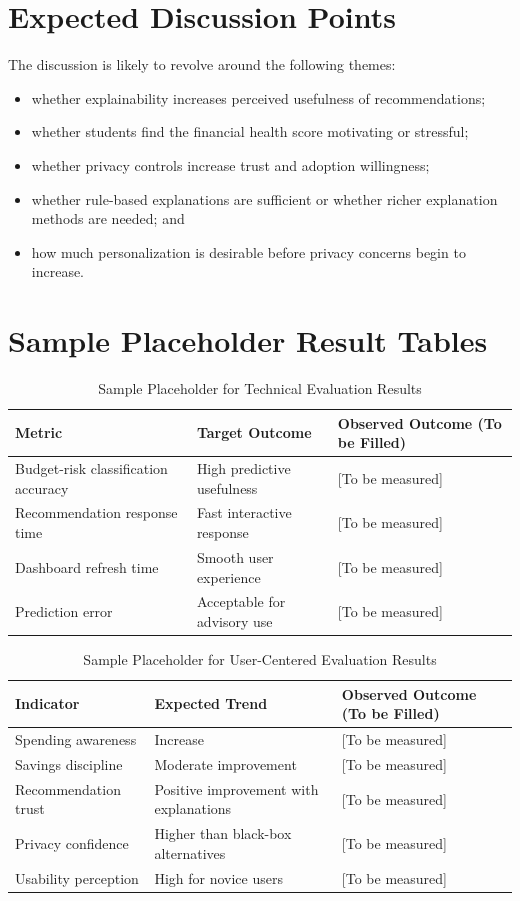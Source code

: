\documentclass[12pt,a4paper]{report}
\begin{document}
\section{Expected Discussion Points}
The discussion is likely to revolve around the following themes:
\begin{itemize}[leftmargin=2em]
\item whether explainability increases perceived usefulness of recommendations;
\item whether students find the financial health score motivating or stressful;
\item whether privacy controls increase trust and adoption willingness;
\item whether rule-based explanations are sufficient or whether richer explanation methods are needed;
and
\item how much personalization is desirable before privacy concerns begin to increase.
\end{itemize}

\section{Sample Placeholder Result Tables}
\begin{table}[H]
\centering
\caption{Sample Placeholder for Technical Evaluation Results}
\label{tab:placeholdertechnical}
\begin{tabular}{p{5cm}p{4cm}p{4cm}}
\toprule
\textbf{Metric} & \textbf{Target Outcome} & \textbf{Observed Outcome (To be Filled)} \\
\midrule
Budget-risk classification accuracy & High predictive usefulness & [To be measured] \\
Recommendation response time & Fast interactive response & [To be measured] \\
Dashboard refresh time & Smooth user experience & [To be measured] \\
Prediction error & Acceptable for advisory use & [To be measured] \\
\bottomrule
\end{tabular}
\end{table}

\begin{table}[H]
\centering
\caption{Sample Placeholder for User-Centered Evaluation Results}
\label{tab:placeholderuser}
\begin{tabular}{p{5cm}p{4cm}p{4cm}}
\toprule
\textbf{Indicator} & \textbf{Expected Trend} & \textbf{Observed Outcome (To be Filled)} \\
\midrule
Spending awareness & Increase & [To be measured] \\
Savings discipline & Moderate improvement & [To be measured] \\
Recommendation trust & Positive improvement with explanations & [To be measured] \\
Privacy confidence & Higher than black-box alternatives & [To be measured] \\
Usability perception & High for novice users & [To be measured] \\
\bottomrule
\end{tabular}
\end{table}
\end{document}
